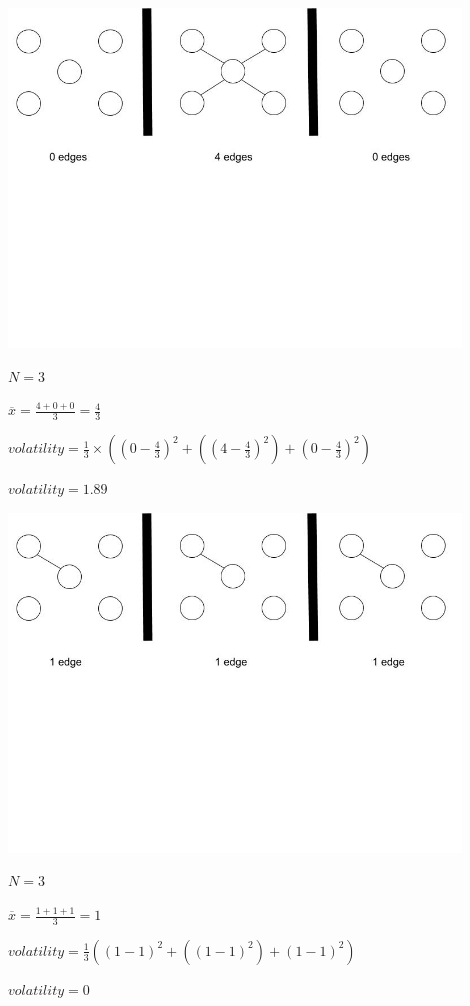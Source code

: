 \begin{center}
\includegraphics[trim={0 10cm 0 -1cm}, width=120mm]{./Figures/volatility1.jpg}

$N = 3$

$\overline{x} = \frac{4 + 0 + 0}{3} = \frac{4}{3}$

$volatility =\frac{1}{3}\times((0 - \frac{4}{3})^2 + ((4 - \frac{4}{3})^2) + (0 - \frac{4}{3})^2) $

$volatility = 1.89$

\includegraphics[trim={0 10cm 0 -1cm}, width=120mm]{./Figures/volatility2.jpg}

$N = 3$

$\overline{x} = \frac{1 + 1 + 1}{3} = 1$

$volatility =\frac{1}{3}((1 - 1)^2 + ((1 - 1)^2) + (1 - 1)^2) $

$volatility = 0$
\end{center}

